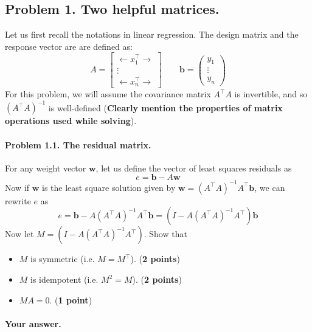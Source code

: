 \documentclass[11pt]{scrartcl}
\newcommand{\bw}{\mathbf{w}}
\newcommand{\bb}{\mathbf{b}}
\begin{document}
	\subsection*{Problem 1. Two helpful matrices.}
	Let us first recall the notations in linear regression. The design matrix and the response vector are are defined as:
	\[
	A = \begin{bmatrix} \leftarrow x_1^\intercal \rightarrow \\ \vdots  \\ \leftarrow x_n^\intercal \rightarrow \end{bmatrix} \qquad
	\bb = \begin{pmatrix} y_1 \\ \vdots \\ y_n \end{pmatrix}
	\]
	For this problem, we will assume the covariance matrix $A^\intercal A$ is invertible, and so $(A^\intercal A)^{-1}$ is well-defined (\textbf{Clearly mention the properties of matrix operations used while solving}).
	
	\paragraph{Problem 1.1. The residual matrix.} For any weight vector $\bw$, let us define the vector of least squares residuals as
	\[
	e = \bb  - A \bw
	\]
	Now if $\bw$ is the least square solution given by $\bw = (A^\intercal A)^{-1} A^\intercal \bb$, we can rewrite $e$ as
	\[
	e = \bb - A (A^\intercal A)^{-1} A^\intercal \bb = \left(I - A (A^\intercal A)^{-1} A^\intercal\right)\bb
	\]
	Now let $M = \left(I - A (A^\intercal A)^{-1} A^\intercal\right)$. Show that
	\begin{itemize}
		\item $M$ is symmetric (i.e. $M = M^\intercal$). (\textbf{2 points})
		\item $M$ is idempotent (i.e. $M^2 = M$). (\textbf{2 points})
		\item $M A = 0$. (\textbf{1 point})
	\end{itemize}
	
	\paragraph{Your answer.}
	
\end{document}

